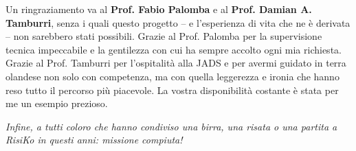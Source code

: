 Un ringraziamento va al \textbf{Prof. Fabio Palomba} e al \textbf{Prof. Damian A. Tamburri}, senza i quali questo progetto – e l'esperienza di vita che ne è derivata – non sarebbero stati possibili.
Grazie al Prof. Palomba per la supervisione tecnica impeccabile e la gentilezza con cui ha sempre accolto ogni mia richiesta. Grazie al Prof. Tamburri per l'ospitalità alla JADS e per avermi guidato in terra olandese non solo con competenza, ma con quella leggerezza e ironia che hanno reso tutto il percorso più piacevole. La vostra disponibilità costante è stata per me un esempio prezioso.

\vspace{1cm}
\noindent
\textit{Infine, a tutti coloro che hanno condiviso una birra, una risata o una partita a RisiKo in questi anni: missione compiuta!}